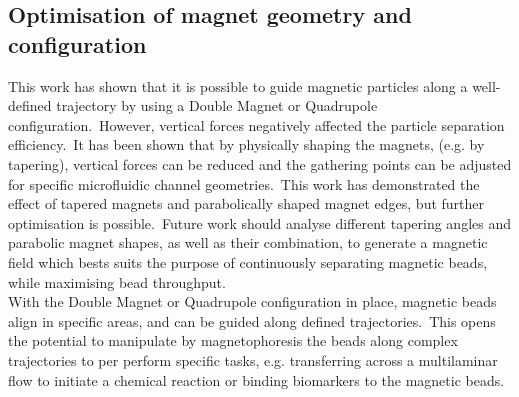 \subsection{Optimisation of magnet geometry and configuration}
This work has shown that it is possible to guide magnetic particles along a well-defined trajectory by using a Double Magnet or Quadrupole configuration.\ However, vertical forces negatively affected the particle separation efficiency.\ It has been shown that by physically shaping the magnets, (e.g. by tapering), vertical forces can be reduced and the gathering points can be adjusted for specific microfluidic channel geometries.\ This work has demonstrated the effect of tapered magnets and parabolically shaped magnet edges, but further optimisation is possible.\ Future work should analyse different tapering angles and parabolic magnet shapes, as well as their combination, to generate a magnetic field which bests suits the purpose of continuously separating magnetic beads, while maximising bead throughput.\\
With the Double Magnet or Quadrupole configuration in place, magnetic beads align in specific areas, and can be guided along defined trajectories.\ This opens the potential to manipulate by magnetophoresis the beads along complex trajectories to per perform specific tasks, e.g. transferring across a multilaminar flow to initiate a chemical reaction or binding biomarkers to the magnetic beads.\


